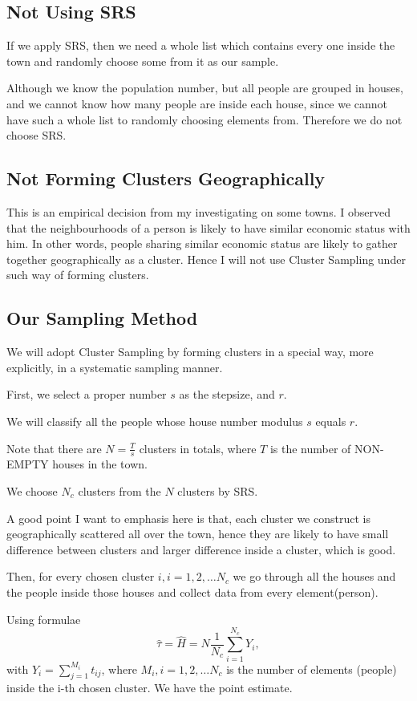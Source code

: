 \documentclass[12pt]{article}%
\begin{document}
\subsection{Not Using SRS}
If we apply SRS, then we need a whole list which contains every one inside the town and randomly choose some from it as our sample.

Although we know the population number, but all people are grouped in houses, and we cannot know how many people are inside each house,
since we cannot have such a whole list to randomly choosing elements from. Therefore we do not choose SRS.

\subsection{Not Forming Clusters Geographically}
This is an empirical decision from my investigating on some towns. I observed that the neighbourhoods of a person is likely to have similar economic status with him.
In other words, people sharing similar economic status are likely to gather together geographically as a cluster. Hence I will not use Cluster Sampling under such way of forming clusters.

\subsection{Our Sampling Method}
We will adopt Cluster Sampling by forming clusters in a special way, more explicitly, in a systematic sampling manner.

First, we select a proper number $s$ as the stepsize, and $r$.

We will classify all the people whose house number modulus $s$ equals $r$.

Note that there are $N=\frac{T}{s}$ clusters in totals, where $T$ is the number of NON-EMPTY houses in the town.

We choose $N_c$ clusters from the $N$ clusters by SRS. 

A good point I want to emphasis here is that, each cluster we construct is geographically scattered all over the town, hence they are likely to have small difference between clusters and larger difference inside a cluster, which is good.

Then, for every chosen cluster $i, i=1,2,\dots N_c$ we go through all the houses and the people inside those houses and collect data from every element(person).

Using formulae $$\hat{\tau}=\hat{H}=N\frac{1}{N_c}\sum_{i=1}^{N_c}Y_i,$$ with $Y_i=\sum_{j=1}^{M_i}t_{ij}$, where $M_i, i=1,2,\dots N_c$ is the number of elements (people) inside the i-th chosen cluster. We have the point estimate.
\end{document}
